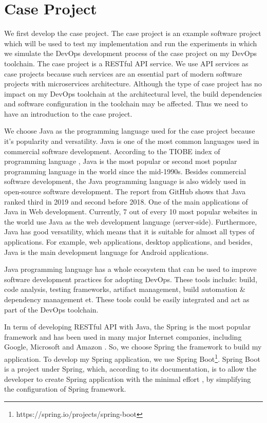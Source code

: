 \section{Case Project}
We first develop the case project. The case project is an example software project which will be used to test my implementation and run the experiments in which we simulate the DevOps development process of the case project on my DevOps toolchain. 
The case project is a RESTful API service. We use API services as case projects because such services are an essential part of modern software projects with microservices architecture. 
Although the type of case project has no impact on my DevOps toolchain at the architectural level, the build dependencies and software configuration in the toolchain may be affected. Thus we need to have an introduction to the case project.
\par
We choose Java as the programming language used for the case project because it's popularity and versatility.
Java is one of the most common languages used in commercial software development. According to the TIOBE index of programming language \cite{indexTIO42:online}, Java is the most popular or second most popular programming language in the world since the mid-1990s. Besides commercial software development, the Java programming language is also widely used in open-source software development. The report \cite{TheState3:online} from GitHub shows that Java ranked third in 2019 and second before 2018. One of the main applications of Java in Web development. Currently, 7 out of every 10 \cite{Programm17:online} most popular websites in the world use Java as the web development language (server-side). Furthermore, Java has good versatility, which means that it is suitable for almost all types of applications. For example, web applications, desktop applications, and besides, Java is the main development language for Android applications.
\par
Java programming language has a whole ecosystem that can be used to improve software development practices for adopting DevOps. These tools include: build, code analysis, testing frameworks, artifact management, build automation \& dependency management et. These tools could be easily integrated and act as part of the DevOps toolchain.
\par
In term of developing RESTful API with Java, the Spring is the most popular framework and has been used in many major Internet companies, including Google, Microsoft and Amazon \cite{SpringWh14:online}.
So, we choose Spring the framework to build my application. To develop my Spring application, we use Spring Boot\footnote{https://spring.io/projects/spring-boot}. Spring Boot is a project under Spring, which, according to its documentation, is to allow the developer to create Spring application with the minimal effort \cite{SpringBo84:online}, by simplifying the configuration of Spring framework.
